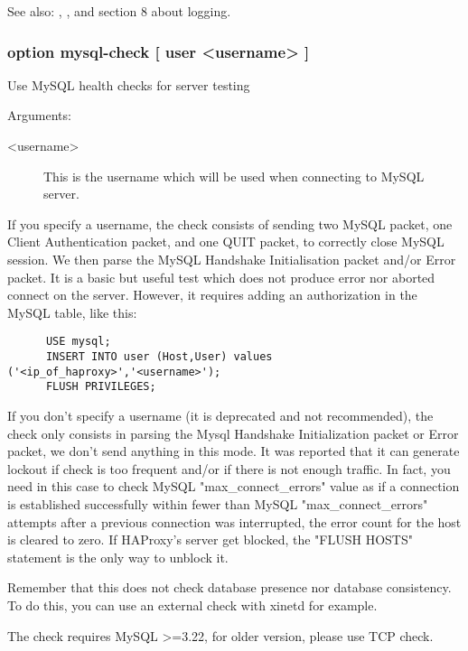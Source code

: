   See also: , , and section 8 about
             logging.

\subsubsection[option mysql-check]{option mysql-check [ user <username> ]}

  Use MySQL health checks for server testing


  Arguments:
\begin{description}
\item[<username>] This is the username which will be used when connecting to MySQL
               server.
\end{description}

  If you specify a username, the check consists of sending two MySQL packet,
  one Client Authentication packet, and one QUIT packet, to correctly close
  MySQL session. We then parse the MySQL Handshake Initialisation packet and/or
  Error packet. It is a basic but useful test which does not produce error nor
  aborted connect on the server. However, it requires adding an authorization
  in the MySQL table, like this:

\begin{verbatim}
      USE mysql;
      INSERT INTO user (Host,User) values ('<ip_of_haproxy>','<username>');
      FLUSH PRIVILEGES;
\end{verbatim}

  If you don't specify a username (it is deprecated and not recommended), the
  check only consists in parsing the Mysql Handshake Initialization packet or
  Error packet, we don't send anything in this mode. It was reported that it
  can generate lockout if check is too frequent and/or if there is not enough
  traffic. In fact, you need in this case to check MySQL "max\_connect\_errors"
  value as if a connection is established successfully within fewer than MySQL
  "max\_connect\_errors" attempts after a previous connection was interrupted,
  the error count for the host is cleared to zero. If HAProxy's server get
  blocked, the "FLUSH HOSTS" statement is the only way to unblock it.

  Remember that this does not check database presence nor database consistency.
  To do this, you can use an external check with xinetd for example.

  The check requires MySQL >=3.22, for older version, please use TCP check.

